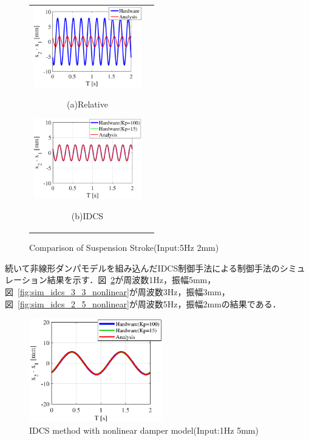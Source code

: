 \documentclass[a4paper,12pt]{article_vdlab_sotsuron}
\begin{document}
\begin{figure}[h]
  \begin{tabular}{cc}
  \begin{minipage}{0.5\hsize}
  \begin{center}
    \includegraphics[height=35mm]{figure/sim_rela_2_5.eps}
    \end{center}
    \begin{center}
    \ (a)Relative\
    \end{center}
  \end{minipage}
  \begin{minipage}{0.5\hsize}
     \begin{center}
      \includegraphics[height=35mm]{figure/sim_idcs_2_5.eps}
      \end{center}
      \begin{center}
      \ (b)IDCS\
    \end{center}
  \end{minipage}
  \end{tabular}
  \vspace*{2mm}
  \caption{Comparison of Suspension Stroke(Input:5Hz 2mm)}
  \label{fig:sim_2_5}
\end{figure}

\newpage
続いて非線形ダンパモデルを組み込んだIDCS制御手法による制御手法のシミュレーション結果を示す．図~\ref{fig:sim_idcs_5_1_nonlinear}が周波数1Hz，振幅5mm，図~\ref{fig:sim_idcs_3_3_nonlinear}が周波数3Hz，振幅3mm，図~\ref{fig:sim_idcs_2_5_nonlinear}が周波数5Hz，振幅2mmの結果である．

\vspace{5mm}
\begin{figure}[htp]
  \begin{center}
    \includegraphics[height=45mm]{figure/sim_idcs_5_1_nonlinear.eps}
    \caption{IDCS method with nonlinear damper model(Input:1Hz 5mm)}
    \label{fig:sim_idcs_5_1_nonlinear}
  \end{center}
\end{figure}
\end{document}

